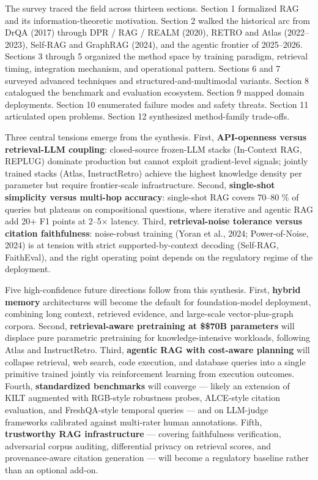 The survey traced the field across thirteen sections. Section 1 formalized RAG and its information-theoretic motivation. Section 2 walked the historical arc from DrQA (2017) through DPR / RAG / REALM (2020), RETRO and Atlas (2022--2023), Self-RAG and GraphRAG (2024), and the agentic frontier of 2025--2026. Sections 3 through 5 organized the method space by training paradigm, retrieval timing, integration mechanism, and operational pattern. Sections 6 and 7 surveyed advanced techniques and structured-and-multimodal variants. Section 8 catalogued the benchmark and evaluation ecosystem. Section 9 mapped domain deployments. Section 10 enumerated failure modes and safety threats. Section 11 articulated open problems. Section 12 synthesized method-family trade-offs.

Three central tensions emerge from the synthesis. First, \textbf{API-openness versus retrieval-LLM coupling}: closed-source frozen-LLM stacks (In-Context RAG, REPLUG) dominate production but cannot exploit gradient-level signals; jointly trained stacks (Atlas, InstructRetro) achieve the highest knowledge density per parameter but require frontier-scale infrastructure. Second, \textbf{single-shot simplicity versus multi-hop accuracy}: single-shot RAG covers 70--80 \% of queries but plateaus on compositional questions, where iterative and agentic RAG add 20+ F1 points at 2--5× latency. Third, \textbf{retrieval-noise tolerance versus citation faithfulness}: noise-robust training (Yoran et al., 2024; Power-of-Noise, 2024) is at tension with strict supported-by-context decoding (Self-RAG, FaithEval), and the right operating point depends on the regulatory regime of the deployment.

Five high-confidence future directions follow from this synthesis. First, \textbf{hybrid memory} architectures will become the default for foundation-model deployment, combining long context, retrieved evidence, and large-scale vector-plus-graph corpora. Second, \textbf{retrieval-aware pretraining at \$\geq\$70B parameters} will displace pure parametric pretraining for knowledge-intensive workloads, following Atlas and InstructRetro. Third, \textbf{agentic RAG with cost-aware planning} will collapse retrieval, web search, code execution, and database queries into a single primitive trained jointly via reinforcement learning from execution outcomes. Fourth, \textbf{standardized benchmarks} will converge --- likely an extension of KILT augmented with RGB-style robustness probes, ALCE-style citation evaluation, and FreshQA-style temporal queries --- and on LLM-judge frameworks calibrated against multi-rater human annotations. Fifth, \textbf{trustworthy RAG infrastructure} --- covering faithfulness verification, adversarial corpus auditing, differential privacy on retrieval scores, and provenance-aware citation generation --- will become a regulatory baseline rather than an optional add-on.

